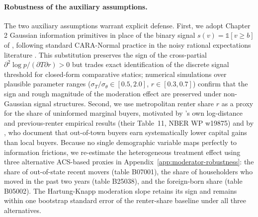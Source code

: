 \paragraph{Robustness of the auxiliary assumptions.} The two
auxiliary assumptions warrant explicit defense.  First, we adopt
\citet{vives2008information} Chapter 2 Gaussian information
primitives in place of the binary signal $s(v) = \mathbb{1}[v \geq b]$
of \citet{kurlat2015testing}, following standard CARA-Normal
practice in the noisy rational expectations literature
\citep{grossman1980impossibility, hellwig1980aggregation,
vives2008information}.  This substitution preserves the sign of the
cross-partial $\partial^2 \log p / (\partial T \partial r) > 0$ but
trades exact identification of the discrete signal threshold for
closed-form comparative statics; numerical simulations over plausible
parameter ranges ($\sigma_T / \sigma_\theta \in [0.5, 2.0]$,
$r \in [0.3, 0.7]$) confirm that the sign and rough magnitude of the
moderation effect are preserved under non-Gaussian signal structures.
Second, we use metropolitan renter share $r$ as a proxy for the
share of uninformed marginal buyers, motivated by
\citet{kurlat2015testing}'s own log-distance and previous-renter
empirical results (their Table~11, NBER WP w19875) and by
\citet{chinco2016misinformed}, who document that out-of-town buyers
earn systematically lower capital gains than local buyers.  Because
no single demographic variable maps perfectly to information
frictions, we re-estimate the heterogeneous treatment effect using
three alternative ACS-based proxies in
Appendix~\ref{app:moderator-robustness}: the share of out-of-state
recent movers (table B07001), the share of householders who moved in
the past two years (table B25038), and the foreign-born share
(table B05002).  The Hartung-Knapp moderation slope retains its sign
and remains within one bootstrap standard error of the renter-share
baseline under all three alternatives.

